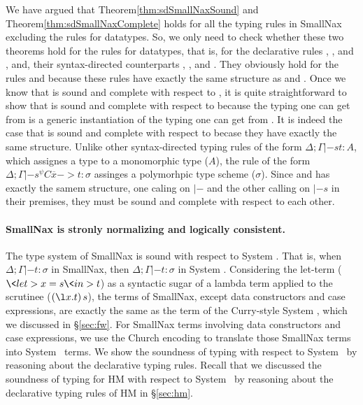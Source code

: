 We have argued that Theorem\;\ref{thm:sdSmallNaxSound} and
Theorem\;\ref{thm:sdSmallNaxComplete} holds for all the typing rules
in SmallNax excluding the rules for datatypes. So, we only need to check
whether these two theorems hold for the rules for datatypes, that is,
for the declarative rules , , and ,
and, their syntax-directed counterparts , ,
and . They obviously hold for the rules  and
 because these rules have exactly the same structure as 
 and . Once we know that  is
sound and complete with respect to , it is quite
straightforward to show that  is sound and complete
with respect to  because the typing one can get
from  is a generic instantiation of the typing
one can get from . It is indeed the case that
 is sound and complete with respect to 
becase they have exactly the same structure. Unlike other syntax-directed
typing rules of the form $\Delta;\Gamma |-s t : A$, which
assignes a type to a monomorphic type ($A$), the rule 
of the form $\Delta;\Gamma |-s^\psi C\overline{x} -> t : \sigma$
assinges a polymorhpic type scheme ($\sigma$). Since  and
 has exactly the samem structure, one caling on $|-$
and the other calling on $|-s$ in their premises, they must be sound
and complete with respect to each other.

\paragraph{SmallNax is stronly normalizing and logically consistent.}
The type system of SmallNax is sound with respect to System \Fw.
That is, when $\Delta;\Gamma |- t:\sigma$ in SmallNax, then 
$\Delta;\Gamma |- t:\sigma$ in System \Fw.
Considering the let-term ($\<let> x=s \<in> t$) as a syntactic sugar of
a lambda term applied to the scrutinee ($(\l x.t)\,s$), the terms of SmallNax,
except data constructors and case expressions, are exactly the same as
the term of the Curry-style System \Fw, which we discussed in \S\ref{sec:fw}.
For SmallNax terms involving data constructors and case expressions, we use
the Church encoding to translate those SmallNax terms into System \Fw\ terms.
We show the soundness of typing with respect to System \Fw\ by reasoning about
the declarative typing rules. Recall that we discussed
the soundness of typing for HM with respect to System \F\ by reasoning about
the declarative typing rules of HM in \S\ref{sec:hm}.

